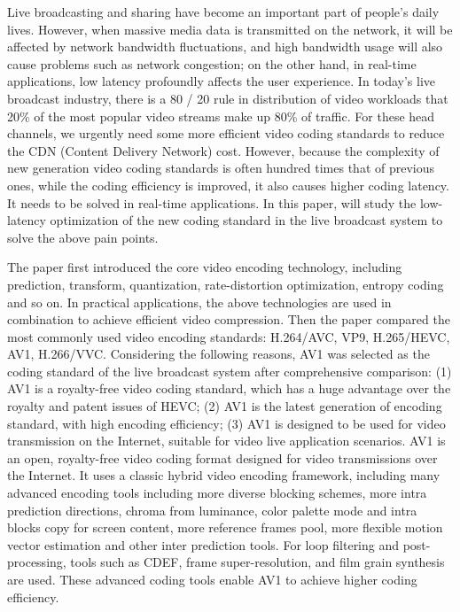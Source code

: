 
\begin{bigabstract}

  Live broadcasting and sharing have become an important part of people's daily lives. However, when massive media data is transmitted on the network, it will be affected by network bandwidth fluctuations, and high bandwidth usage will also cause problems such as network congestion; on the other hand, in real-time applications, low latency profoundly affects the user experience. In today's live broadcast industry, there is a 80 / 20 rule in distribution of video workloads that 20\% of the most popular video streams make up 80\% of traffic. For these head channels, we urgently need some more efficient video coding standards to reduce the CDN (Content Delivery Network) cost. However, because the complexity of new generation video coding standards is often hundred times that of previous ones, while the coding efficiency is improved, it also causes higher coding latency. It needs to be solved in real-time applications. In this paper, will study the low-latency optimization of the new coding standard in the live broadcast system to solve the above pain points.

  The paper first introduced the core video encoding technology, including prediction, transform, quantization, rate-distortion optimization, entropy coding and so on. In practical applications, the above technologies are used in combination to achieve efficient video compression. Then the paper compared the most commonly used video encoding standards: H.264/AVC, VP9, H.265/HEVC, AV1, H.266/VVC. Considering the following reasons, AV1 was selected as the coding standard of the live broadcast system after comprehensive comparison:
  (1) AV1 is a royalty-free video coding standard, which has a huge advantage over the royalty and patent issues of HEVC;
  (2) AV1 is the latest generation of encoding standard, with high encoding efficiency;
  (3) AV1 is designed to be used for video transmission on the Internet, suitable for video live application scenarios.
  AV1 is an open, royalty-free video coding format designed for video transmissions over the Internet. It uses a classic hybrid video encoding framework, including many advanced encoding tools including more diverse blocking schemes, more intra prediction directions, chroma from luminance, color palette mode and intra blocks copy for screen content, more reference frames pool, more flexible motion vector estimation and other inter prediction tools. For loop filtering and post-processing, tools such as CDEF, frame super-resolution, and film grain synthesis are used. These advanced coding tools enable AV1 to achieve higher coding efficiency.


\end{bigabstract}
